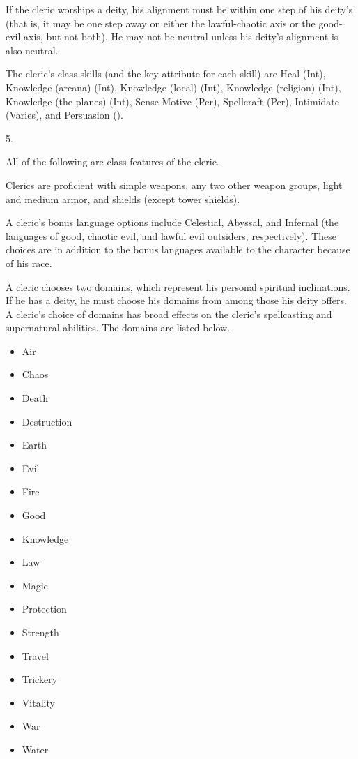  If the cleric worships a deity, his alignment must be within one step of his deity's (that is, it may be one step away on either the lawful-chaotic axis or the good-evil axis, but not both).
He may not be neutral unless his deity's alignment is also neutral.

The cleric's class skills (and the key attribute for each skill) are Heal (Int), Knowledge (arcana) (Int), Knowledge (local) (Int), Knowledge (religion) (Int), Knowledge (the planes) (Int), Sense Motive (Per), Spellcraft (Per), Intimidate (Varies), and Persuasion (\x).

5.

All of the following are class features of the cleric.

 Clerics are proficient with simple weapons, any two other weapon groups, light and medium armor, and shields (except tower shields).

A cleric's bonus language options include Celestial, Abyssal, and Infernal (the languages of good, chaotic evil, and lawful evil outsiders, respectively).
These choices are in addition to the bonus languages available to the character because of his race.

A cleric chooses two domains, which represent his personal spiritual inclinations.
If he has a deity, he must choose his domains from among those his deity offers.
A cleric's choice of domains has broad effects on the cleric's spellcasting and supernatural abilities.
The domains are listed below.

\begin{itemize}
    \item{Air} 
    \item{Chaos}
    \item{Death}
    \item{Destruction} 
    \item{Earth}
    \item{Evil}
    \item{Fire}
    \item{Good}
    \item{Knowledge}
    \item{Law}
    \item{Magic}
    \item{Protection}
    \item{Strength}
    \item{Travel}
    \item{Trickery}
    \item{Vitality}
    \item{War}
    \item{Water}
\end{itemize}

